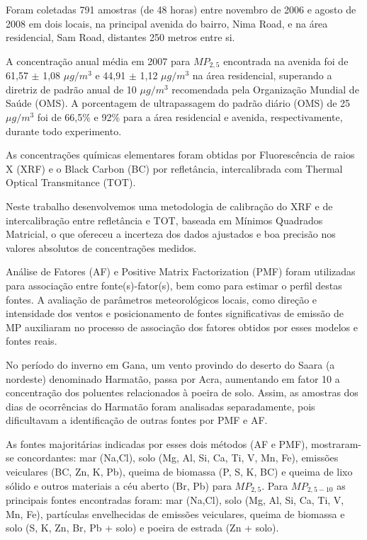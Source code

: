 Foram coletadas 791 amostras (de 48 horas) entre novembro de 2006 e 
agosto de 2008 em dois locais, na principal avenida do bairro, Nima Road, e na área 
residencial, Sam Road, distantes 250 metros entre si. 

A concentração anual média em 2007 para $MP_{2,5}$ encontrada na avenida 
foi de 61,57 $\pm$ 1,08 $\mu g/m^3$ e 44,91 $\pm$ 1,12 $\mu g/m^3$ na área residencial, 
superando a diretriz de padrão anual de 10 $\mu g/m^3$ recomendada pela 
Organização Mundial de Saúde (OMS). A porcentagem de ultrapassagem 
do padrão diário (OMS) de 25 $\mu g/m^3$ foi de 66,5\% e 92\% para a área residencial e avenida, respectivamente, durante todo experimento. 

As concentrações químicas elementares foram obtidas por 
Fluorescência de raios X (XRF) e o Black Carbon (BC) por 
refletância, intercalibrada com Thermal Optical Transmitance (TOT). 

Neste trabalho desenvolvemos uma metodologia de calibração do XRF 
e de intercalibração entre refletância e TOT, 
baseada em Mínimos Quadrados Matricial, o que ofereceu a 
incerteza dos dados ajustados e boa precisão nos valores 
absolutos de concentrações medidos.

Análise de Fatores (AF) e Positive Matrix Factorization (PMF) foram utilizadas
para associação entre fonte(s)-fator(s), bem como para estimar o perfil destas fontes. 
A avaliação de parâmetros meteorológicos locais, como direção e intensidade 
dos ventos e posicionamento de fontes significativas de emissão de MP 
auxiliaram no processo de associação dos fatores obtidos por esses modelos e 
fontes reais.

No período do inverno em Gana, um vento  
provindo do deserto do Saara (a nordeste) denominado Harmatão, 
passa por Acra, aumentando em fator 10 a concentração dos poluentes 
relacionados à poeira de solo. Assim, as amostras dos dias de ocorrências 
do Harmatão foram analisadas separadamente, pois dificultavam a 
identificação de outras fontes por PMF e AF.

As fontes majoritárias indicadas por esses dois métodos (AF e PMF), 
mostraram-se concordantes: mar (Na,Cl), solo (Mg, Al, Si, Ca, Ti, V, Mn, Fe), emissões veiculares (BC, Zn, K, Pb), queima de biomassa (P, S, K, BC) e queima de lixo sólido e outros materiais a céu aberto (Br, Pb) para $MP_{2,5}$. Para $MP_{2,5-10}$ as principais fontes encontradas foram: mar (Na,Cl), solo (Mg, Al, Si, Ca, Ti, V, Mn, Fe), partículas envelhecidas de emissões veiculares, queima de biomassa e solo (S, K, Zn, Br, Pb + solo) e poeira de estrada (Zn + solo).

